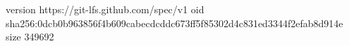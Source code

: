version https://git-lfs.github.com/spec/v1
oid sha256:0dcb0b963856f4b609cabecdcddc673ff5f85302d4c831ed3344f2efab8d914e
size 349692
